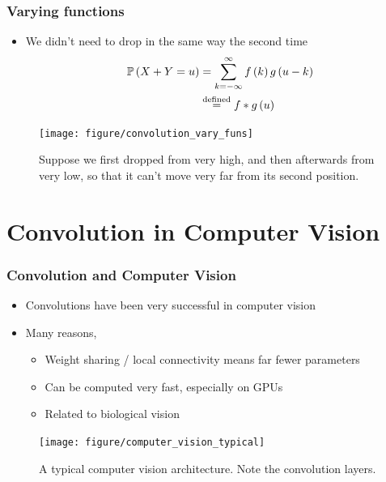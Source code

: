 \documentclass[10pt,mathserif]{beamer}
\begin{document}
\begin{frame}
  \frametitle{Varying functions}
  \begin{itemize}
    \item We didn't need to drop in the same way the second time
      \begin{align*}
        \mathbb{P}\left({X + Y = u}\right) &= \sum_{k = -\infty}^{\infty} f\left(k\right)g\left(u - k\right) \\
        &\stackrel{\text{defined}}{=} f * g\left(u\right)
      \end{align*}
  \end{itemize}
  \begin{figure}[ht]
    \centering
    \texttt{[image: figure/convolution\_vary\_funs]}
    \caption{Suppose we first dropped from very high, and then afterwards from
      very low, so that it can't move very far from its second position.
       \label{fig:convolution_vary_funs} }
  \end{figure}
\end{frame}

\section{Convolution in Computer Vision}

\begin{frame}
  \frametitle{Convolution and Computer Vision}
  \begin{itemize}
  \item Convolutions have been very successful in computer vision
  \item Many reasons,
    \begin{itemize}
    \item Weight sharing / local connectivity means far fewer parameters
    \item Can be computed very fast, especially on GPUs
    \item Related to biological vision
    \end{itemize}
  \end{itemize}
\begin{figure}[ht]
  \centering
  \texttt{[image: figure/computer\_vision\_typical]}
  \caption{A typical computer vision architecture. Note the convolution
    layers. \label{fig:label} }
\end{figure}
\end{frame}
\end{document}
